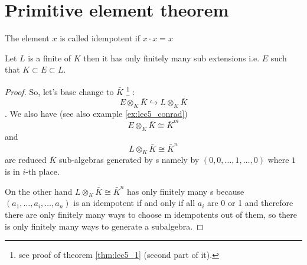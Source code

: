 \section{Primitive element theorem}

\begin{definition}[Idempotent]
  The element $x$ is called idempotent if $x \cdot x = x$
  \label{def:idempotent}
\end{definition}

\begin{theorem}
  Let $L$ is a finite  of $K$ then it
  has only finitely many sub extensions i.e. $E$ such that $K \subset
  E \subset L$.
  \begin{proof}
    So, let's base change to $\bar{K}$
    \footnote {
      see proof of theorem \ref{thm:lec5_1} (second part of it).
    }  
    :
    \[
    E \otimes_{K} \bar{K} \hookrightarrow
    L \otimes_{K} \bar{K}
    \].
    We also have (see also example \ref{ex:lec5_conrad})
    \[
    E \otimes_{K} \bar{K} \cong \bar{K}^m
    \]
    and
    \[
    L \otimes_{K} \bar{K} \cong \bar{K}^n
    \]
    are reduced $\bar{K}$ sub-algebras generated by
    s namely by
    $\left(0,0, \dots, 1, \dots, 0\right)$ where $1$ is in $i$-th
    place.

    On the other hand $L \otimes_K \bar{K} \cong \bar{K}^n$ has only
    finitely many s because 
    $\left(a_1, \dots, a_i, \dots, a_n\right)$ is an idempotent if and
    only if all $a_i$ are 0 or 1 and therefore there
    are only finitely many ways to choose m idempotents out of them,
    so there is only finitely many ways to generate a subalgebra.  
  \end{proof}
  \label{thm:primitiveelement}
\end{theorem}


